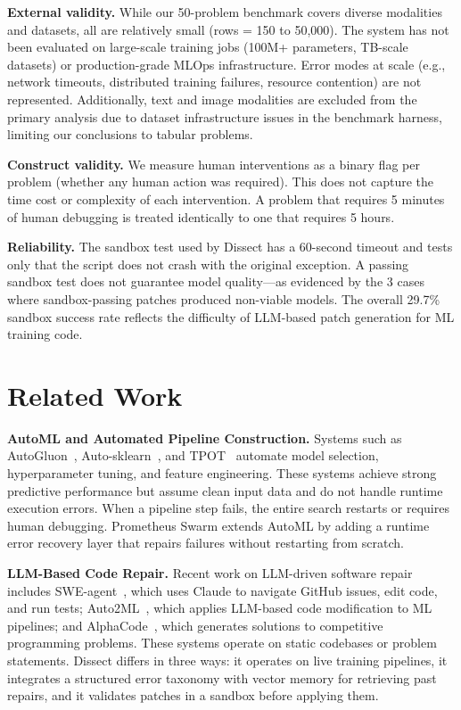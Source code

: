 \documentclass[conference]{IEEEtran}
\begin{document}
\textbf{External validity.} While our 50-problem benchmark covers diverse modalities and
datasets, all are relatively small (rows = 150 to 50,000). The system has not been
evaluated on large-scale training jobs (100M+ parameters, TB-scale datasets) or
production-grade MLOps infrastructure. Error modes at scale (e.g., network timeouts,
distributed training failures, resource contention) are not represented. Additionally,
text and image modalities are excluded from the primary analysis due to dataset
infrastructure issues in the benchmark harness, limiting our conclusions to tabular
problems.

\textbf{Construct validity.} We measure human interventions as a binary flag per problem
(whether any human action was required). This does not capture the time cost or complexity
of each intervention. A problem that requires 5 minutes of human debugging is treated
identically to one that requires 5 hours.

\textbf{Reliability.} The sandbox test used by Dissect has a 60-second timeout and tests
only that the script does not crash with the original exception. A passing sandbox test
does not guarantee model quality---as evidenced by the 3 cases where sandbox-passing
patches produced non-viable models. The overall 29.7\% sandbox success rate reflects the
difficulty of LLM-based patch generation for ML training code.

\section{Related Work}

\textbf{AutoML and Automated Pipeline Construction.} Systems such as
AutoGluon~\cite{erickson2020autogluon}, Auto-sklearn~\cite{feurer2015efficient}, and
TPOT~\cite{olson2016evaluation} automate model selection, hyperparameter tuning, and
feature engineering. These systems achieve strong predictive performance but assume clean
input data and do not handle runtime execution errors. When a pipeline step fails, the
entire search restarts or requires human debugging. Prometheus Swarm extends AutoML by
adding a runtime error recovery layer that repairs failures without restarting from
scratch.

\textbf{LLM-Based Code Repair.} Recent work on LLM-driven software repair includes
SWE-agent~\cite{yang2024sweagent}, which uses Claude to navigate GitHub issues, edit
code, and run tests; Auto2ML~\cite{aws2025auto2ml}, which applies LLM-based code
modification to ML pipelines; and AlphaCode~\cite{deepmind2022alphacode}, which generates
solutions to competitive programming problems. These systems operate on static codebases
or problem statements. Dissect differs in three ways: it operates on live training
pipelines, it integrates a structured error taxonomy with vector memory for retrieving
past repairs, and it validates patches in a sandbox before applying them.
\end{document}
